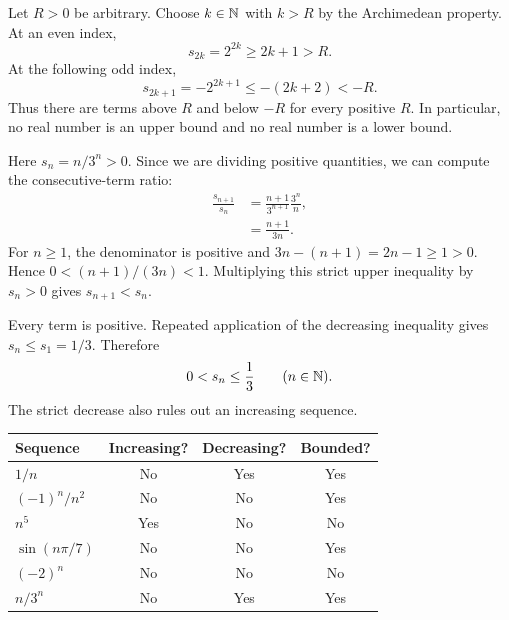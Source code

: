 Let $R>0$ be arbitrary. Choose $k\in\mathbb{N}$ with $k>R$ by the
Archimedean property. At an even index,
\[
 s_{2k}=2^{2k}\ge2k+1>R.
\]
At the following odd index,
\[
 s_{2k+1}=-2^{2k+1}\le-(2k+2)<-R.
\]
Thus there are terms above $R$ and below $-R$ for every positive
$R$. In particular, no real number is an upper bound and no real
number is a lower bound.


Here $s_n=n/3^n>0$. Since we are dividing positive quantities, we can
compute the consecutive-term ratio:
\begin{align*}
 \frac{s_{n+1}}{s_n}
   &=\frac{n+1}{3^{n+1}}\frac{3^n}{n},\\
   &=\frac{n+1}{3n}.
\end{align*}
For $n\ge1$, the denominator is positive and
$3n-(n+1)=2n-1\ge1>0$. Hence
$0<(n+1)/(3n)<1$. Multiplying this strict upper inequality by
$s_n>0$ gives $s_{n+1}<s_n$.

Every term is positive. Repeated application of the decreasing
inequality gives $s_n\le s_1=1/3$. Therefore
\[
 0<s_n\le\frac13\qquad(n\in\mathbb{N}).
\]
The strict decrease also rules out an increasing sequence.


\begin{center}
\begin{tabular}{@{}lccc@{}}
\toprule
Sequence & Increasing? & Decreasing? & Bounded?\\
\midrule
$1/n$ & No & Yes & Yes\\
$(-1)^n/n^2$ & No & No & Yes\\
$n^5$ & Yes & No & No\\
$\sin(n\pi/7)$ & No & No & Yes\\
$(-2)^n$ & No & No & No\\
$n/3^n$ & No & Yes & Yes\\
\bottomrule
\end{tabular}
\end{center}


